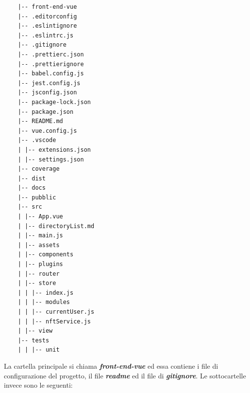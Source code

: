 \begin{lstlisting}
	|-- front-end-vue
	|-- .editorconfig
	|-- .eslintignore
	|-- .eslintrc.js
	|-- .gitignore
	|-- .prettierc.json
	|-- .prettierignore
	|-- babel.config.js
	|-- jest.config.js
	|-- jsconfig.json
	|-- package-lock.json
	|-- package.json
	|-- README.md
	|-- vue.config.js
	|-- .vscode
	| |-- extensions.json
	| |-- settings.json
	|-- coverage
	|-- dist
	|-- docs
	|-- pubblic
	|-- src
	| |-- App.vue
	| |-- directoryList.md
	| |-- main.js
	| |-- assets
	| |-- components
	| |-- plugins
	| |-- router
	| |-- store
	| | |-- index.js
	| | |-- modules
	| | |-- currentUser.js
	| | |-- nftService.js
	| |-- view
	|-- tests
	| | |-- unit
\end{lstlisting}

La cartella principale si chiama \textbf{\textit{front-end-vue}} ed essa contiene i file di configurazione del progetto, il file \textbf{\textit{readme}} ed il file di \textbf{\textit{gitignore}}. Le sottocartelle invece sono le seguenti:
